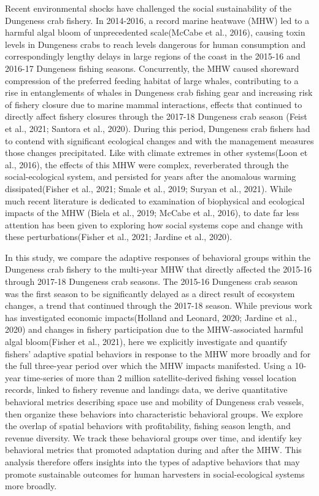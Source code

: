 \documentclass[]{elsarticle} %
\begin{document}
Recent environmental shocks have challenged the social sustainability of
the Dungeness crab fishery. In 2014-2016, a record marine heatwave (MHW)
led to a harmful algal bloom of unprecedented scale(McCabe et al.,
2016), causing toxin levels in Dungeness crabs to reach levels dangerous
for human consumption and correspondingly lengthy delays in large
regions of the coast in the 2015-16 and 2016-17 Dungeness fishing
seasons. Concurrently, the MHW caused shoreward compression of the
preferred feeding habitat of large whales, contributing to a rise in
entanglements of whales in Dungeness crab fishing gear and increasing
risk of fishery closure due to marine mammal interactions, effects that
continued to directly affect fishery closures through the 2017-18
Dungeness crab season (Feist et al., 2021; Santora et al., 2020). During
this period, Dungeness crab fishers had to contend with significant
ecological changes and with the management measures those changes
precipitated. Like with climate extremes in other systems(Loon et al.,
2016), the effects of this MHW were complex, reverberated through the
social-ecological system, and persisted for years after the anomalous
warming dissipated(Fisher et al., 2021; Smale et al., 2019; Suryan et
al., 2021). While much recent literature is dedicated to examination of
biophysical and ecological impacts of the MHW (Biela et al., 2019;
McCabe et al., 2016), to date far less attention has been given to
exploring how social systems cope and change with these
perturbations(Fisher et al., 2021; Jardine et al., 2020).

In this study, we compare the adaptive responses of behavioral groups
within the Dungeness crab fishery to the multi-year MHW that directly
affected the 2015-16 through 2017-18 Dungeness crab seasons. The 2015-16
Dungeness crab season was the first season to be significantly delayed
as a direct result of ecosystem changes, a trend that continued through
the 2017-18 season. While previous work has investigated economic
impacts(Holland and Leonard, 2020; Jardine et al., 2020) and changes in
fishery participation due to the MHW-associated harmful algal
bloom(Fisher et al., 2021), here we explicitly investigate and quantify
fishers' adaptive spatial behaviors in response to the MHW more broadly
and for the full three-year period over which the MHW impacts
manifested. Using a 10-year time-series of more than 2 million
satellite-derived fishing vessel location records, linked to fishery
revenue and landings data, we derive quantitative behavioral metrics
describing space use and mobility of Dungeness crab vessels, then
organize these behaviors into characteristic behavioral groups. We
explore the overlap of spatial behaviors with profitability, fishing
season length, and revenue diversity. We track these behavioral groups
over time, and identify key behavioral metrics that promoted adaptation
during and after the MHW. This analysis therefore offers insights into
the types of adaptive behaviors that may promote sustainable outcomes
for human harvesters in social-ecological systems more broadly.
\end{document}
